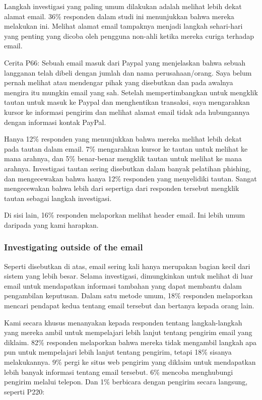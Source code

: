 \documentclass[lettersize,journal]{IEEEtran}
\begin{document}
Langkah investigasi yang paling umum dilakukan adalah melihat lebih dekat
alamat email. 36\% responden dalam studi ini menunjukkan bahwa mereka melakukan
ini. Melihat alamat email tampaknya menjadi langkah sehari-hari yang penting
yang dicoba oleh pengguna non-ahli ketika mereka curiga terhadap email.

Cerita P66: Sebuah email masuk dari Paypal yang menjelaskan bahwa sebuah
langganan telah dibeli dengan jumlah dan nama perusahaan/orang. Saya belum
pernah melihat atau mendengar pihak yang disebutkan dan pada awalnya mengira
itu mungkin email yang sah. Setelah mempertimbangkan untuk mengklik tautan
untuk masuk ke Paypal dan menghentikan transaksi, saya mengarahkan kursor ke
informasi pengirim dan melihat alamat email tidak ada hubungannya dengan
informasi kontak PayPal.

Hanya 12\% responden yang menunjukkan bahwa mereka melihat lebih dekat pada
tautan dalam email. 7\% mengarahkan kursor ke tautan untuk melihat ke mana
arahnya, dan 5\% benar-benar mengklik tautan untuk melihat ke mana arahnya.
Investigasi tautan sering disebutkan dalam banyak pelatihan phishing, dan
mengecewakan bahwa hanya 12\% responden yang menyelidiki tautan. Sangat
mengecewakan bahwa lebih dari sepertiga dari responden tersebut mengklik tautan
sebagai langkah investigasi.

Di sisi lain, 16\% responden melaporkan melihat header email. Ini lebih umum
daripada yang kami harapkan.

\subsubsection{Investigating outside of the email}

Seperti disebutkan di atas, email sering kali hanya merupakan bagian kecil dari
sistem yang lebih besar. Selama investigasi, dimungkinkan untuk melihat di luar
email untuk mendapatkan informasi tambahan yang dapat membantu dalam
pengambilan keputusan. Dalam satu metode umum, 18\% responden melaporkan
mencari pendapat kedua tentang email tersebut dan bertanya kepada orang lain.

Kami secara khusus menanyakan kepada responden tentang langkah-langkah yang
mereka ambil untuk mempelajari lebih lanjut tentang pengirim email yang
diklaim. 82\% responden melaporkan bahwa mereka tidak mengambil langkah apa pun
untuk mempelajari lebih lanjut tentang pengirim, tetapi 18\% sisanya
melakukannya. 9\% pergi ke situs web pengirim yang diklaim untuk mendapatkan
lebih banyak informasi tentang email tersebut. 6\% mencoba menghubungi pengirim
melalui telepon. Dan 1\% berbicara dengan pengirim secara langsung, seperti
P220:
\end{document}
